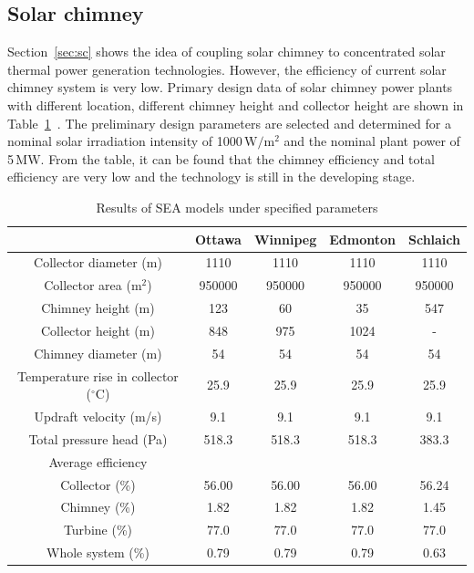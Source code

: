 \subsection{Solar chimney}

Section~\ref{sec:sc} shows the idea of coupling solar chimney to concentrated solar thermal power generation technologies.
However, the efficiency of current solar chimney system is very low. Primary design data of solar chimney power plants with different location, different chimney height and collector height are shown in Table~\ref{tab:sc}~\cite{Bilgen2005}. The preliminary design parameters are selected and determined for a nominal solar irradiation intensity of 1000$\,\mathrm{W/m^2}$ and the nominal plant power of 5$\,\mathrm{MW}$. From the table, it can be found that the chimney efficiency and total efficiency are very low and the technology is still in the developing stage.
\begin{table}[htbp]
	\caption{Results of SEA models under specified parameters}
	\begin{center}
	\begin{tabular}{ccccc}
		\toprule
		&Ottawa    &Winnipeg    &Edmonton    &Schlaich\\
		\midrule
		Collector diameter (m)    &	1110	&	1110	&	1110	&	1110 \\
  Collector area ($\mathrm{m^2}$)    & 950000    & 950000	&	950000	&	950000\\
  Chimney height (m)    &123    &60    &    35&    547\\
  Collector height (m)    &848    &975    &1024    &    -\\
  Chimney diameter (m)    &54    &54    &54    &54\\
  Temperature rise in collector ($\mathrm{^\circ C}$)    &25.9    &25.9    &25.9    &25.9\\
  Updraft velocity (m/s)&9.1    &9.1    &9.1    &9.1\\
  Total pressure head (Pa)&518.3    &518.3    &518.3    &383.3\\
  Average efficiency\\
  Collector (\%)    &56.00    &56.00    &56.00    &56.24\\
  Chimney (\%)    &1.82    &1.82    &1.82    &1.45\\
  Turbine (\%)    &77.0    &77.0    &77.0    &77.0\\
  Whole system (\%)    &0.79    &0.79    &0.79    &0.63\\
		\bottomrule
	\end{tabular}
	\end{center}
	\label{tab:sc}
\end{table}

